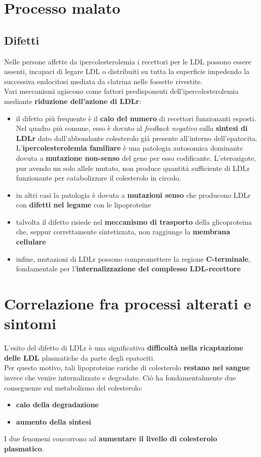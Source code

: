 \documentclass[a4paper, 12pt]{article}
\begin{document}
\begin{titlepage}
\section{Processo malato}

\subsection{Difetti}
Nelle persone affette da ipercolesterolemia i recettori per le LDL possono essere assenti, incapaci di legare LDL o distribuiti su tutta la superficie impedendo la successiva endocitosi mediata da clatrina nelle fossette rivestite.\\
Vari meccanismi agiscono come fattori predisponenti dell'ipercolesterolemia mediante \textbf{riduzione dell'azione di LDLr}:
\begin{itemize}
\item il difetto più frequente è il \textbf{calo del numero} di recettori funzionanti esposti. Nel quadro più comune, esso è dovuto al \textit{feedback negativo} sulla \textbf{sintesi di LDLr} dato dall'abbondante colesterolo già presente all'interno dell'epatocita.\\ L'\textbf{ipercolesterolemia familiare} è una patologia autosomica dominante dovuta a \textbf{mutazione non-senso} del gene per esso codificante. L'eterozigote, pur avendo un solo allele mutato, non produce quantità sufficiente di LDLr funzionante per catabolizzare il colesterolo in circolo.
\item in altri casi la patologia è dovuta a \textbf{mutazioni senso} che producono LDLr con \textbf{difetti nel legame} con le lipoproteine
\item talvolta il difetto risiede nel \textbf{meccanismo di trasporto} della glicoproteina che, seppur correttamente sintetizzata, non raggiunge la \textbf{membrana cellulare}
\item infine, mutazioni di LDLr possono compromettere la regione \textbf{C-terminale}, fondamentale per l'\textbf{internalizzazione del complesso LDL-recettore}
\end{itemize}

\section{Correlazione fra processi alterati e sintomi}
L'esito del difetto di LDLr è una significativa \textbf{difficoltà nella ricaptazione delle LDL} plasmatiche da parte degli epatociti.\\
Per questo motivo, tali lipoproteine cariche di colesterolo \textbf{restano nel sangue} invece che venire internalizzate e degradate. Ciò ha fondamentalmente due conseguenze sul metabolismo del colesterolo:
\begin{itemize}
\item \textbf{calo della degradazione}
\item \textbf{aumento della sintesi}
\end{itemize}
I due fenomeni concorrono ad \textbf{aumentare il livello di colesterolo plasmatico}.


\end{titlepage}
\end{document}
